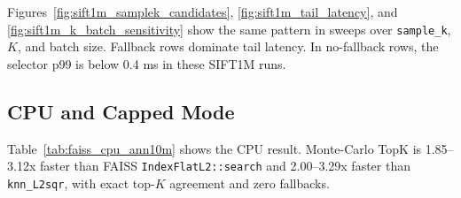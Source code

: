 Figures~\ref{fig:sift1m_samplek_candidates},
\ref{fig:sift1m_tail_latency}, and
\ref{fig:sift1m_k_batch_sensitivity} show the same pattern in sweeps over
\texttt{sample\_k}, $K$, and batch size. Fallback rows dominate tail latency.
In no-fallback rows, the selector p99 is below 0.4 ms in these SIFT1M runs.

\subsection{CPU and Capped Mode}

Table~\ref{tab:faiss_cpu_ann10m} shows the CPU result. Monte-Carlo TopK is
1.85--3.12x faster than FAISS \texttt{IndexFlatL2::search} and 2.00--3.29x
faster than \texttt{knn\_L2sqr}, with exact top-$K$ agreement and zero
fallbacks.

\begin{table}[!htbp]
\centering
\caption{FAISS CPU ANN10M comparison on an Intel Core i9-13900KF.\@ All rows use
1024 queries, $K=64$, \texttt{sample\_n=32768}, \texttt{sample\_k=4}, and
\texttt{candidate\_cap=8192}. Times are seconds.}%
\label{tab:faiss_cpu_ann10m}
\end{table}

\begin{table}[!htbp]
\centering
\caption{FAISS overflow-capping stress test based on SIFT1M. Effective 10M rows
repeat the SIFT1M score matrix; they are not physical 10M dataset runs.
Candidates are mean/min/max.}%
\label{tab:faiss_overflow_capping}
\end{table}

